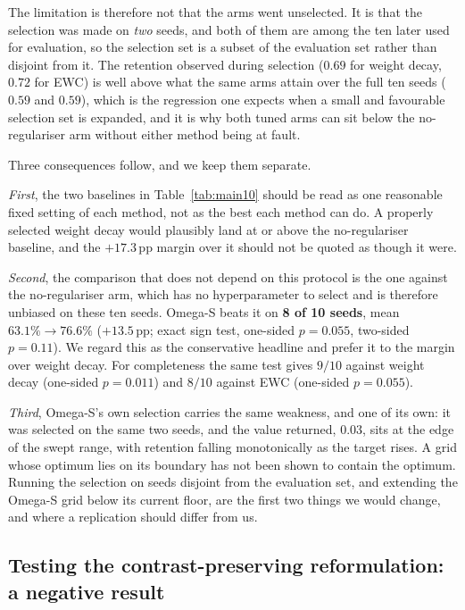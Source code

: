 \documentclass[11pt,a4paper]{article}
\begin{document}
The limitation is therefore not that the arms went unselected. It is that the
selection was made on \emph{two} seeds, and both of them are among the ten
later used for evaluation, so the selection set is a subset of the evaluation
set rather than disjoint from it. The retention observed during selection
($0.69$ for weight decay, $0.72$ for EWC) is well above what the same arms
attain over the full ten seeds ($0.59$ and $0.59$), which is the regression one
expects when a small and favourable selection set is expanded, and it is why
both tuned arms can sit below the no-regulariser arm without either method
being at fault.

Three consequences follow, and we keep them separate.

\emph{First}, the two baselines in Table~\ref{tab:main10} should be read as one
reasonable fixed setting of each method, not as the best each method can do. A
properly selected weight decay would plausibly land at or above the
no-regulariser baseline, and the $+17.3$\,pp margin over it should not be quoted
as though it were.

\emph{Second}, the comparison that does not depend on this protocol is the one
against the no-regulariser arm, which has no hyperparameter to select and is
therefore unbiased on these ten seeds. Omega-S beats it on \textbf{8 of 10
seeds}, mean $63.1\% \to 76.6\%$ ($+13.5$\,pp; exact sign test, one-sided
$p = 0.055$, two-sided $p = 0.11$). We regard this as the conservative headline
and prefer it to the margin over weight decay. For completeness the same test
gives $9/10$ against weight decay (one-sided $p = 0.011$) and $8/10$ against EWC
(one-sided $p = 0.055$).

\emph{Third}, Omega-S's own selection carries the same weakness, and one of its
own: it was selected on the same two seeds, and the value returned, $0.03$,
sits at the edge of the swept range, with retention falling monotonically as
the target rises. A grid whose optimum lies on its boundary has not been shown
to contain the optimum. Running the selection on seeds disjoint from the
evaluation set, and extending the Omega-S grid below its current floor, are the
first two things we would change, and where a replication should differ from
us.

\subsection{Testing the contrast-preserving reformulation: a negative result}
\label{app:cosine}
\label{sec:cosine}
\end{document}
